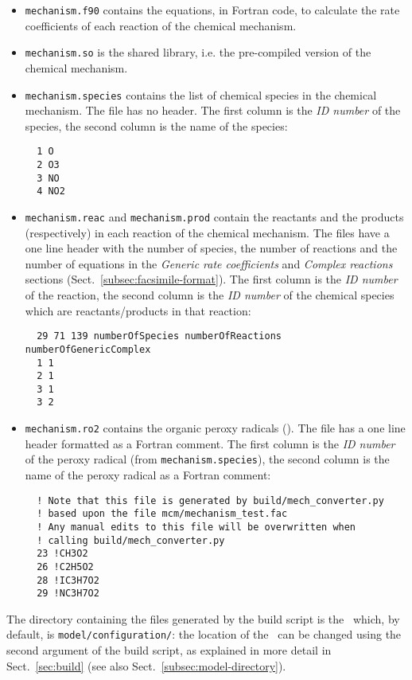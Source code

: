 \begin{itemize}
\item \texttt{mechanism.f90} contains the equations, in Fortran code,
  to calculate the rate coefficients of each reaction of the chemical
  mechanism.
\item \texttt{mechanism.so} is the shared library, i.e. the
  pre-compiled version of the chemical mechanism.
\item \texttt{mechanism.species} contains the list of chemical species
  in the chemical mechanism. The file has no header. The first column
  is the \emph{ID number} of the species, the second column is the
  name of the species:
  \begin{verbatim}
  1 O
  2 O3
  3 NO
  4 NO2
  \end{verbatim}
\item \texttt{mechanism.reac} and \texttt{mechanism.prod} contain the
  reactants and the products (respectively) in each reaction of the
  chemical mechanism. The files have a one line header with the number
  of species, the number of reactions and the number of equations in
  the \emph{Generic rate coefficients} and \emph{Complex reactions}
  sections (Sect.~\ref{subsec:facsimile-format}). The first column is
  the \emph{ID number} of the reaction, the second column is the
  \emph{ID number} of the chemical species which are
  reactants/products in that reaction:
  \begin{verbatim}
  29 71 139 numberOfSpecies numberOfReactions numberOfGenericComplex
  1 1
  2 1
  3 1
  3 2
\end{verbatim}
\item \texttt{mechanism.ro2} contains the organic peroxy radicals
  (). The file has a one line header formatted as a Fortran
  comment. The first column is the \emph{ID number} of the peroxy
  radical (from \texttt{mechanism.species}), the second column is the
  name of the peroxy radical as a Fortran comment:
  \begin{verbatim}
  ! Note that this file is generated by build/mech_converter.py
  ! based upon the file mcm/mechanism_test.fac
  ! Any manual edits to this file will be overwritten when
  ! calling build/mech_converter.py
  23 !CH3O2
  26 !C2H5O2
  28 !IC3H7O2
  29 !NC3H7O2
  \end{verbatim}
\end{itemize}

The directory containing the files generated by the build script is
the \sharedir\ which, by default, is \texttt{model/configuration/}:
the location of the \sharedir\ can be changed using the second
argument of the build script, as explained in more detail in
Sect.~\ref{sec:build} (see also Sect.~\ref{subsec:model-directory}).

